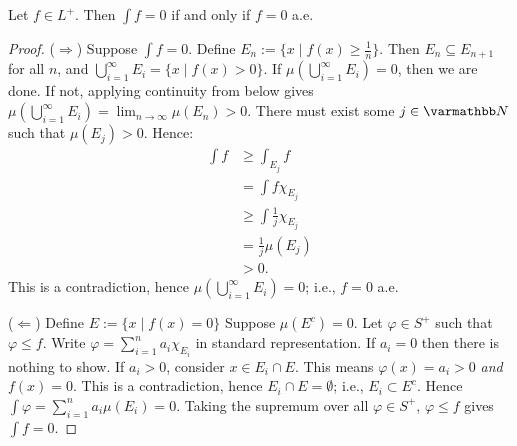 \begin{proposition}\label{prop:int-equals-zero-iff-funct-equals-zero}
    Let $f \in L^+$. Then $\int f = 0$ if and only if $f = 0$ a.e.
\end{proposition}
    \begin{proof}
        ($\Rightarrow$) Suppose $\int f = 0$. Define $E_n := \{ x \mid f(x) \geq \frac{1}{n}\}$. Then $E_n \subseteq E_{n+1}$ for all $n$, and $\bigcup_{i = 1}^\infty E_i = \{x \mid f(x) > 0\}$. If $\mu \left( \bigcup_{i = 1}^\infty E_i \right) = 0$, then we are done. If not, applying continuity from below gives $\mu \left( \bigcup_{i = 1}^\infty E_i \right) = \lim_{n \rightarrow \infty}\mu(E_n) > 0$. There must exist some $j \in \bfN$ such that $\mu(E_j) > 0$. Hence:
            \begin{equation*}
            \begin{split}
                \int f 
                & \geq \int_{E_j} f \\
                & = \int f \chi_{E_j} \\
                & \geq \int \frac{1}{j} \chi_{E_j} \\
                & = \frac{1}{j} \mu(E_j) \\
                & > 0.
            \end{split}
            \end{equation*}
        This is a contradiction, hence $\mu \left( \bigcup_{i = 1}^\infty E_i \right) = 0$; i.e., $f = 0$ a.e.

        ($\Leftarrow$) Define $E:= \{x \mid f(x) = 0\}$ Suppose $\mu(E^c) = 0$. Let $\varphi \in S^+$ such that $\varphi \leq f$. Write $\varphi = \sum_{i = 1}^n a_i \chi_{E_i}$ in standard representation. If $a_i = 0$ then there is nothing to show. If $a_i > 0$, consider $x \in E_i \cap E$. This means $\varphi(x) = a_i > 0$ \textit{and} $f(x) = 0$. This is a contradiction, hence $E_i \cap E = \emptyset$; i.e., $E_i \subset E^c$. Hence $\int \varphi = \sum_{i =1 }^n a_i \mu(E_i) = 0$. Taking the supremum over all $\varphi \in S^+$, $\varphi \leq f$ gives $\int f = 0$.
    \end{proof}

